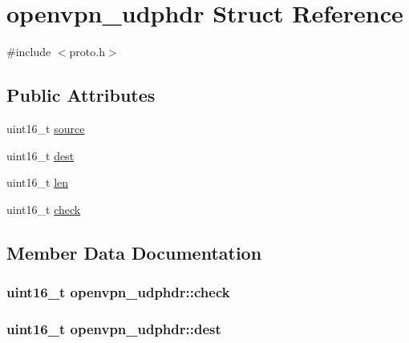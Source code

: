\hypertarget{structopenvpn__udphdr}{}\section{openvpn\+\_\+udphdr Struct Reference}
\label{structopenvpn__udphdr}


{\ttfamily \#include $<$proto.\+h$>$}

\subsection*{Public Attributes}
\begin{DoxyCompactItemize}
\item 
uint16\+\_\+t \hyperlink{structopenvpn__udphdr_a388ec6b6a30d5f208a2c7983e2362e79}{source}
\item 
uint16\+\_\+t \hyperlink{structopenvpn__udphdr_ac148224209c831ae2587215ce9c30ff0}{dest}
\item 
uint16\+\_\+t \hyperlink{structopenvpn__udphdr_afe5ff5a9c66a2853169b19d7b4cc37e8}{len}
\item 
uint16\+\_\+t \hyperlink{structopenvpn__udphdr_a044c1d7500155329ddaa2cb3984fddb6}{check}
\end{DoxyCompactItemize}


\subsection{Member Data Documentation}
\hypertarget{structopenvpn__udphdr_a044c1d7500155329ddaa2cb3984fddb6}{}
\subsubsection[{check}]{\setlength{\rightskip}{0pt plus 5cm}uint16\+\_\+t openvpn\+\_\+udphdr\+::check}\label{structopenvpn__udphdr_a044c1d7500155329ddaa2cb3984fddb6}
\hypertarget{structopenvpn__udphdr_ac148224209c831ae2587215ce9c30ff0}{}
\subsubsection[{dest}]{\setlength{\rightskip}{0pt plus 5cm}uint16\+\_\+t openvpn\+\_\+udphdr\+::dest}\label{structopenvpn__udphdr_ac148224209c831ae2587215ce9c30ff0}
\hypertarget{structopenvpn__udphdr_afe5ff5a9c66a2853169b19d7b4cc37e8}{}
